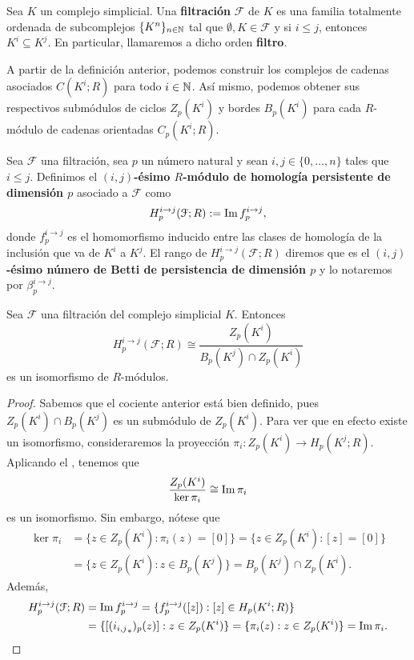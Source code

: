 \begin{definicion}
	Sea \(K\) un complejo simplicial. Una \textbf{filtración} \(\mathcal{F}\) de \(K\) es una familia totalmente ordenada de subcomplejos \(\{K^n\}_{n \in \mathbb{N}}\) tal que \(\emptyset, K \in \mathcal{F}\) y si \(i \leq j\), entonces \(K^i \subseteq K^j\). En particular, llamaremos a dicho orden \textbf{filtro}.
\end{definicion}
A partir de la definición anterior, podemos construir los complejos de cadenas asociados \(C(K^i;R)\) para todo \(i \in \mathbb{N}\). Así mismo, podemos obtener sus respectivos submódulos de ciclos \(Z_p(K^i)\) y bordes \(B_p(K^i)\) para cada $R$-módulo de cadenas orientadas \(C_p(K^i;R)\).
\begin{definicion}
	Sea \(\mathcal{F}\) una filtración, sea \(p\) un número natural y sean \(i,j \in \{0, \dots, n\}\) tales que $i \leq j$. Definimos el  \textbf{\((i,j)\)-ésimo \(R\)-módulo de homología persistente de dimensión \(p\)} asociado a \(\mathcal{F}\) como
	\[
		H_p^{i \to j}(\mathcal{F};R) := \operatorname{Im} f_p^{i \to j},
	\]
	donde $f_p^{i \to j}$ es el homomorfismo inducido entre las clases de homología de la inclusión que va de $K^i$ a $K^j$. El rango de \(H_p^{i \to j}(\mathcal{F};R)\) diremos que es el \textbf{\((i,j)\)-ésimo número de Betti de persistencia de dimensión \(p\)} y lo notaremos por \(\beta_p^{i \to j}\).
\end{definicion}
\begin{proposicion}
	Sea \(\mathcal{F}\) una filtración del complejo simplicial \(K\). Entonces
	\[
		H_p^{i \to j}(\mathcal{F};R) \cong \frac{Z_p(K^i)}{B_p(K^j) \cap Z_p(K^i)}
	\]
	es un isomorfismo de \(R\)-módulos.
\end{proposicion}
\begin{proof}
	Sabemos que el cociente anterior está bien definido, pues \(Z_p(K^i) \cap B_p(K^j)\) es un submódulo de \(Z_p(K^i)\). Para ver que en efecto existe un isomorfismo, consideraremos la proyección \(\pi_i : Z_p(K^i) \to H_p(K^j;R)\). Aplicando el , tenemos que 
	\[
		\frac{Z_p(K^i)}{\ker \pi_i} \cong \operatorname{Im} \pi_i
	\]
	es un isomorfismo. Sin embargo, nótese que
	\begin{align*}
		\ker \pi_i &= \{z \in Z_p(K^i) : \pi_i(z) = [0] \}
				   = \{z \in Z_p(K^i) : [z] = [0] \} \\ 
				   &= \{z \in Z_p(K^i) : z \in B_p(K^j) \}
				   = B_p(K^j) \cap Z_p(K^i).
	\end{align*}
	Además, 
	\begin{align*}
		H_p^{i \to j}(\mathcal{F};R) &= \operatorname{Im} f_p^{i \to j} = \{f_p^{i \to j}([z]) : [z] \in H_p(K^i;R) \} \\ 
							   &= \{[({i_{i,j}}_*)_p(z)] : z \in Z_p(K^i) \}  
							   = \{\pi_i(z) : z \in Z_p(K^i) \} 
							   = \operatorname{Im} \pi_i.
	\end{align*}
\end{proof}
